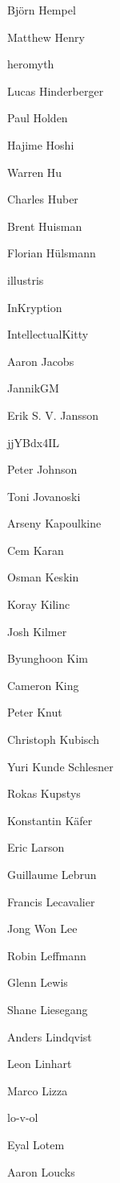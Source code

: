 \begin{DoxyItemize}
\item Björn Hempel
\item Matthew Henry
\item heromyth
\item Lucas Hinderberger
\item Paul Holden
\item Hajime Hoshi
\item Warren Hu
\item Charles Huber
\item Brent Huisman
\item Florian Hülsmann
\item illustris
\item In\+Kryption
\item Intellectual\+Kitty
\item Aaron Jacobs
\item Jannik\+GM
\item Erik S. V. Jansson
\item jj\+YBdx4\+IL
\item Peter Johnson
\item Toni Jovanoski
\item Arseny Kapoulkine
\item Cem Karan
\item Osman Keskin
\item Koray Kilinc
\item Josh Kilmer
\item Byunghoon Kim
\item Cameron King
\item Peter Knut
\item Christoph Kubisch
\item Yuri Kunde Schlesner
\item Rokas Kupstys
\item Konstantin Käfer
\item Eric Larson
\item Guillaume Lebrun
\item Francis Lecavalier
\item Jong Won Lee
\item Robin Leffmann
\item Glenn Lewis
\item Shane Liesegang
\item Anders Lindqvist
\item Leon Linhart
\item Marco Lizza
\item lo-\/v-\/ol
\item Eyal Lotem
\item Aaron Loucks

\end{DoxyItemize}
